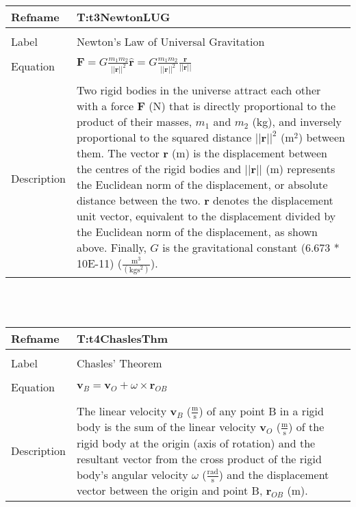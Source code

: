 \documentclass[12pt]{article}
\begin{document}
~\newline
\noindent \begin{minipage}{\textwidth}
\begin{tabular}{p{} p{}}
\toprule \textbf{Refname} & \textbf{T:t3NewtonLUG}
\label{T:t3NewtonLUG}
\\ \midrule \\
Label & Newton's Law of Universal Gravitation
\\ \midrule \\
Equation & $\mathbf{F}=G \frac{{m_{1}} {m_{2}}}{||\mathbf{r}||^{2}} \mathbf{\hat{r}}=G \frac{{m_{1}} {m_{2}}}{||\mathbf{r}||^{2}} \frac{\mathbf{r}}{||\mathbf{r}||}$
\\ \midrule \\
Description & Two rigid bodies in the universe attract each other with a force $\mathbf{F}$ (N) that is directly proportional to the product of their masses, ${m_{1}}$ and ${m_{2}}$ (kg), and inversely proportional to the squared distance ${||\mathbf{r}||^{2}}$ ($\text{m}^{2}$) between them. The vector $\mathbf{r}$ (m) is the displacement between the centres of the rigid bodies and $||\mathbf{r}||$ (m) represents the Euclidean norm of the displacement, or absolute distance between the two. $\mathbf{\hat{r}}$ denotes the displacement unit vector, equivalent to the displacement divided by the Euclidean norm of the displacement, as shown above. Finally, $G$ is the gravitational constant (6.673 * 10E-11) ($\frac{\text{m}^{3}}{(\text{kg}\text{s}^{2})}$).
\\ \bottomrule \end{tabular}
\end{minipage}\\
~\newline
\noindent \begin{minipage}{\textwidth}
\begin{tabular}{p{} p{}}
\toprule \textbf{Refname} & \textbf{T:t4ChaslesThm}
\label{T:t4ChaslesThm}
\\ \midrule \\
Label & Chasles' Theorem
\\ \midrule \\
Equation & ${\mathbf{v}_{B}}={\mathbf{v}_{O}}+\omega{}\times{\mathbf{r}_{OB}}$
\\ \midrule \\
Description & The linear velocity ${\mathbf{v}_{B}}$ ($\frac{\text{m}}{\text{s}}$) of any point B in a rigid body is the sum of the linear velocity ${\mathbf{v}_{O}}$ ($\frac{\text{m}}{\text{s}}$) of the rigid body at the origin (axis of rotation) and the resultant vector from the cross product of the rigid body's angular velocity $\omega{}$ ($\frac{\text{rad}}{\text{s}}$) and the displacement vector between the origin and point B, ${\mathbf{r}_{OB}}$ (m).
\\ \bottomrule \end{tabular}
\end{minipage}\\
\end{document}
